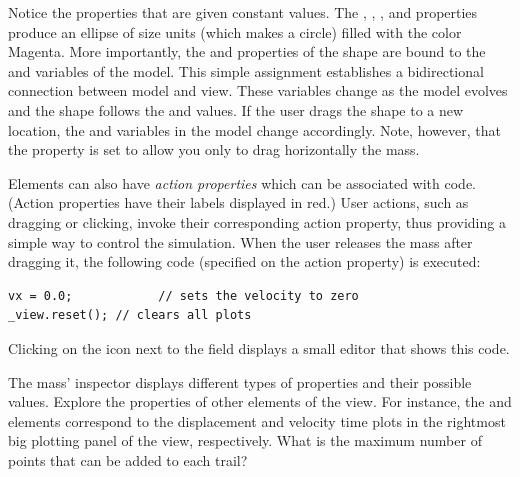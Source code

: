 Notice the properties that are given constant values. The , , , and  properties produce an ellipse of size  units (which makes a circle) filled with the color
Magenta. More importantly, the  and  properties of  the shape are bound to the  and 
variables of the model. This simple assignment establishes a bidirectional connection between model and view. These
variables change as the model evolves and the shape follows the  and  values. If the user drags the
shape to a new location, the  and  variables in the model change accordingly.  Note, however, that the  property is set to allow you only to drag horizontally the mass.

Elements can also have \emph{action properties} which can be associated with code.
(Action properties have their labels displayed in red.) User actions, such as dragging or clicking, invoke their
corresponding action property, thus providing a simple way to control the simulation. When the user releases the mass after dragging it, the following code (specified on the  action property) is executed:

\begin{listing}
\begin{verbatim}
vx = 0.0;            // sets the velocity to zero
_view.reset(); // clears all plots
\end{verbatim}
\end{listing}

\noindent Clicking on the icon next to the field displays a small editor that shows this code.


\begin{exercise}\label{ex:03ExplorationJavascript/properties}
The mass' inspector displays different types of properties and their possible values. Explore the properties of other
elements of the view.  For instance, the  and  elements correspond to the
displacement and velocity time plots in the rightmost big plotting panel of the view, respectively.  What is the maximum number of points that can be added to each trail?
\end{exercise}

